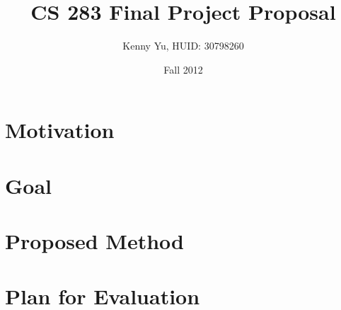 \documentclass[12pt]{article}
\begin{document}
\title{CS 283 Final Project Proposal}
\date{Fall 2012}
\author{Kenny Yu, HUID: 30798260}

\maketitle





\section{Motivation}

\section{Goal}

\section{Proposed Method}

\section{Plan for Evaluation}
\end{document}
